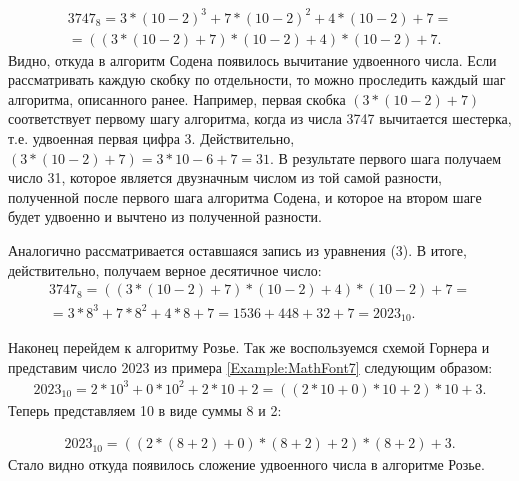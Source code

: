 \documentclass[14pt, russian]{scrartcl}
\begin{document}
\label{Example:MathFont14} 
\begin{equation*}\label{eq:14}
\begin{aligned}
3747_8 = 3 * (10-2)^3 + 7 * (10-2)^2 + 4 * (10-2) + 7 = \\
= ((3 * (10-2) + 7)*(10-2) + 4) * (10-2) + 7. 
\end{aligned}
\end{equation*}
Видно, откуда в алгоритм Содена появилось вычитание удвоенного числа. Если рассматривать каждую скобку по отдельности, то можно проследить каждый шаг алгоритма, описанного ранее. Например, первая скобка $(3 * (10-2) + 7)$ соответствует первому шагу алгоритма, когда из числа 3747 вычитается шестерка, т.е. удвоенная первая цифра 3. Действительно, $(3 * (10-2) + 7) = 3*10 - 6 + 7 = 31$.
В результате первого шага получаем число 31, которое является двузначным числом из той самой разности, полученной после первого шага алгоритма Содена, и которое на втором шаге будет удвоенно и вычтено из полученной разности.

Аналогично рассматривается оставшаяся запись из уравнения (3). В итоге, действительно, получаем верное десятичное число: 
\label{Example:MathFont15} 
\begin{equation*}\label{eq:15}
\begin{aligned}
3747_8 = ((3 * (10-2) + 7)*(10-2) + 4) * (10-2) + 7 = \\
= 3 * 8^3 + 7 * 8^2 + 4 * 8 + 7 = 1536 + 448 + 32 + 7 = 2023_{10}. 
\end{aligned}
\end{equation*}

Наконец перейдем к алгоритму Розье. Так же воспользуемся схемой Горнера и представим число 2023 из примера \ref{Example:MathFont7} следующим образом:
\label{Example:MathFont16} 
\begin{equation*}\label{eq:16}
\begin{aligned}
2023_{10} = 2 * 10^3 + 0 * 10^2 + 2 * 10 + 2 = ((2 * 10 + 0)*10 + 2) * 10 + 3. 
\end{aligned}
\end{equation*}
Теперь представляем 10 в виде суммы 8 и 2:

\label{Example:MathFont17} 
\begin{equation*}\label{eq:17}
\begin{aligned}
2023_{10} = ((2 * (8+2) + 0)*(8+2) + 2) * (8+2) + 3. 
\end{aligned}
\end{equation*}
Стало видно откуда появилось сложение удвоенного числа в алгоритме Розье. 
\end{document}
